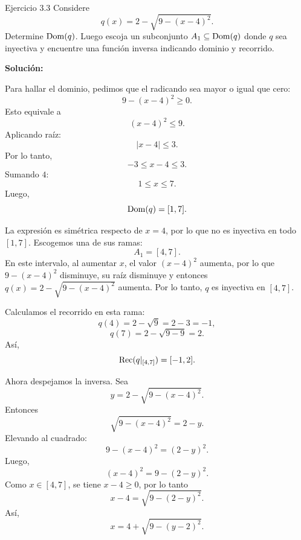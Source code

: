 \documentclass[letterpaper, 12pt]{article}
\begin{document}
\begin{solucionbox}{Ejercicio 3.3}
Considere
\[
    q(x)=2-\sqrt{9-(x-4)^2}.
\]
Determine $\operatorname{Dom}(q)$. Luego escoja un subconjunto $A_1\subseteq \operatorname{Dom}(q)$ donde $q$ sea inyectiva y encuentre una funci\'on inversa indicando dominio y recorrido.

\textbf{Soluci\'on:}

Para hallar el dominio, pedimos que el radicando sea mayor o igual que cero:
\[
    9-(x-4)^2\geq 0.
\]
Esto equivale a
\[
    (x-4)^2\leq 9.
\]
Aplicando ra\'iz:
\[
    |x-4|\leq 3.
\]
Por lo tanto,
\[
    -3\leq x-4\leq 3.
\]
Sumando $4$:
\[
    1\leq x\leq 7.
\]
Luego,
\[
    \operatorname{Dom}(q)=[1,7].
\]

La expresi\'on es sim\'etrica respecto de $x=4$, por lo que no es inyectiva en todo $[1,7]$. Escogemos una de sus ramas:
\[
    A_1=[4,7].
\]
En este intervalo, al aumentar $x$, el valor $(x-4)^2$ aumenta, por lo que $9-(x-4)^2$ disminuye, su ra\'iz disminuye y entonces $q(x)=2-\sqrt{9-(x-4)^2}$ aumenta. Por lo tanto, $q$ es inyectiva en $[4,7]$.

Calculamos el recorrido en esta rama:
\[
    q(4)=2-\sqrt{9}=2-3=-1,
\]
\[
    q(7)=2-\sqrt{9-9}=2.
\]
As\'i,
\[
    \operatorname{Rec}(q|_{[4,7]})=[-1,2].
\]

Ahora despejamos la inversa. Sea
\[
    y=2-\sqrt{9-(x-4)^2}.
\]
Entonces
\[
    \sqrt{9-(x-4)^2}=2-y.
\]
Elevando al cuadrado:
\[
    9-(x-4)^2=(2-y)^2.
\]
Luego,
\[
    (x-4)^2=9-(2-y)^2.
\]
Como $x\in[4,7]$, se tiene $x-4\geq 0$, por lo tanto
\[
    x-4=\sqrt{9-(2-y)^2}.
\]
As\'i,
\[
    x=4+\sqrt{9-(y-2)^2}.
\]

\end{solucionbox}
\end{document}

